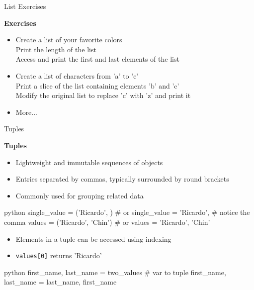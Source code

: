 \documentclass[
	11pt, 
]{beamer}
\begin{document}

\begin{frame}[fragile]{List Exercises}

\begin{alertblock}{\textbf{Exercises}}
\begin{itemize}
    \item Create a list of your favorite colors\\
        Print the length of the list\\
        Access and print the first and last elements of the list\\

    \item Create a list of characters from 'a' to 'e' \\
        Print a slice of the list containing elements 'b' and 'c' \\
        Modify the original list to replace 'c' with 'z' and print it \\

    \item More...
\end{itemize}

\end{alertblock}

\end{frame}


\begin{frame}[fragile]{Tuples}

\textbf{Tuples}

\begin{itemize}
    \item Lightweight and immutable sequences of objects
    \item Entries separated by commas, typically surrounded by round brackets
    \item Commonly used for grouping related data
\end{itemize}

\begin{mintedbox}{python}
single_value = ('Ricardo', ) # or
single_value = 'Ricardo', # notice the comma
values = ('Ricardo', 'Chin') # or
values = 'Ricardo', 'Chin'
\end{mintedbox}

\begin{itemize}
    \item Elements in a tuple can be accessed using indexing
    \item \texttt{values[0]} returns 'Ricardo'
\end{itemize}

\begin{mintedbox}{python}
first_name, last_name = two_values # var to tuple
first_name, last_name = last_name, first_name
\end{mintedbox}

\end{frame}
\end{document}
